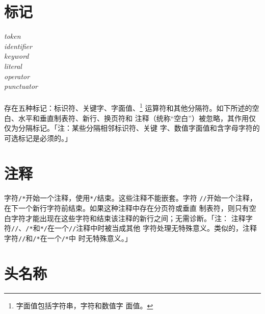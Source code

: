 \section{标记}

\noindent \mbox{\qquad \textit{token}}                                        \\
\mbox{\qquad \qquad \textit{identifier}}                                      \\
\mbox{\qquad \qquad \textit{keyword}}                                         \\
\mbox{\qquad \qquad \textit{literal}}                                         \\
\mbox{\qquad \qquad \textit{operator}}                                        \\
\mbox{\qquad \qquad \textit{punctuator}}

\paragraph{}
存在五种标记：标识符、关键字、字面值、\footnote{字面值包括字符串，字符和数值字
面值。} 运算符和其他分隔符。如下所述的空白、水平和垂直制表符、新行、换页符和
注释（统称``空白''）被忽略，其作用仅仅为分隔标记。「注：某些分隔相邻标识符、关键
字、数值字面值和含字母字符的可选标记是必须的。」

\section{注释}
\paragraph{}
字符\texttt{/*}开始一个注释，使用\texttt{*/}结束。这些注释不能嵌套。字符
\texttt{//}开始一个注释，在下一个新行字符前结束。如果这种注释中存在分页符或垂直
制表符，则只有空白字符才能出现在这些字符和结束该注释的新行之间；无需诊断。「注：
注释字符\texttt{//}、\texttt{/*}和\texttt{*/}在一个\texttt{//}注释中时被当成其他
字符处理无特殊意义。类似的，注释字符\texttt{//}和\texttt{/*}在一个\texttt{/*}中
时无特殊意义。」

\section{头名称}

